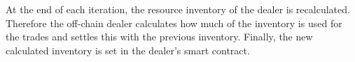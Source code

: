 At the end of each iteration, the resource inventory of the dealer is recalculated.
Therefore the off-chain dealer calculates how much of the inventory is used for
the trades and settles this with the previous inventory.
Finally, the new calculated inventory is set in the dealer's smart contract.

\clearpage